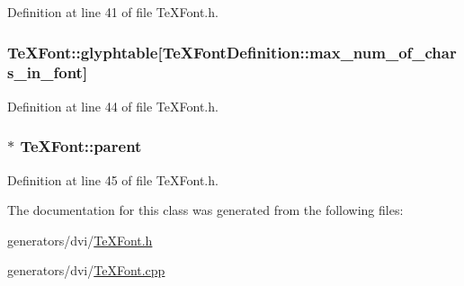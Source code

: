 Definition at line 41 of file Te\+X\+Font.\+h.

\hypertarget{classTeXFont_a4ec465c9b189f0845a25ad5c99903e5f}{
\subsubsection[{glyphtable}]{ Te\+X\+Font\+::glyphtable\mbox{[}{\bf Te\+X\+Font\+Definition\+::max\+\_\+num\+\_\+of\+\_\+chars\+\_\+in\+\_\+font}\mbox{]}\hspace{0.3cm}{\ttfamily [protected]}}}\label{classTeXFont_a4ec465c9b189f0845a25ad5c99903e5f}


Definition at line 44 of file Te\+X\+Font.\+h.

\hypertarget{classTeXFont_a72d8eb1f0377749cf4a45dfabf1c3dd5}{
\subsubsection[{parent}]{$\ast$ Te\+X\+Font\+::parent\hspace{0.3cm}{\ttfamily [protected]}}}\label{classTeXFont_a72d8eb1f0377749cf4a45dfabf1c3dd5}


Definition at line 45 of file Te\+X\+Font.\+h.



The documentation for this class was generated from the following files\+:\begin{DoxyCompactItemize}
\item 
generators/dvi/\hyperlink{TeXFont_8h}{Te\+X\+Font.\+h}\item 
generators/dvi/\hyperlink{TeXFont_8cpp}{Te\+X\+Font.\+cpp}\end{DoxyCompactItemize}
